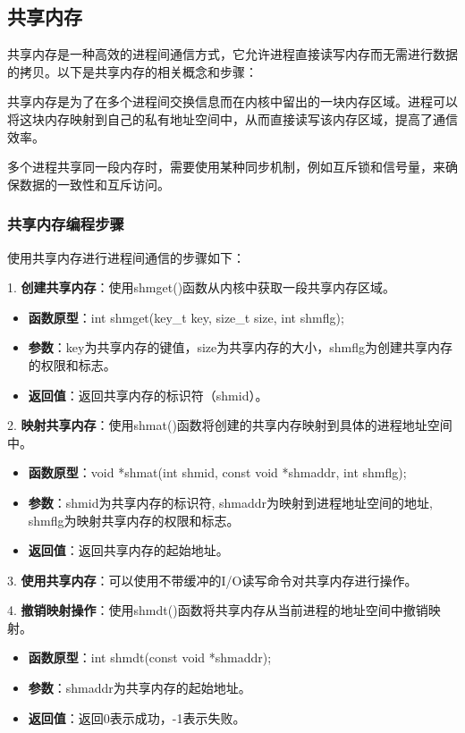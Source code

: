 \documentclass[12pt, a4paper, oneside]{ctexbook}
\numberwithin{figure}{section}
\begin{document}
\subsection{共享内存}
共享内存是一种高效的进程间通信方式，它允许进程直接读写内存而无需进行数据的拷贝。以下是共享内存的相关概念和步骤：

共享内存是为了在多个进程间交换信息而在内核中留出的一块内存区域。进程可以将这块内存映射到自己的私有地址空间中，从而直接读写该内存区域，提高了通信效率。

多个进程共享同一段内存时，需要使用某种同步机制，例如互斥锁和信号量，来确保数据的一致性和互斥访问。

\subsubsection{共享内存编程步骤}
使用共享内存进行进程间通信的步骤如下：

1. \textbf{创建共享内存}：使用shmget()函数从内核中获取一段共享内存区域。
   \begin{itemize}
       \item \textbf{函数原型}：int shmget(key_t key, size_t size, int shmflg);
       \item \textbf{参数}：key为共享内存的键值，size为共享内存的大小，shmflg为创建共享内存的权限和标志。
       \item \textbf{返回值}：返回共享内存的标识符（shmid）。
   \end{itemize}
   
2. \textbf{映射共享内存}：使用shmat()函数将创建的共享内存映射到具体的进程地址空间中。
   \begin{itemize}
       \item \textbf{函数原型}：void *shmat(int shmid, const void *shmaddr, int shmflg);
       \item \textbf{参数}：shmid为共享内存的标识符, shmaddr为映射到进程地址空间的地址, shmflg为映射共享内存的权限和标志。
       \item \textbf{返回值}：返回共享内存的起始地址。
   \end{itemize}

3. \textbf{使用共享内存}：可以使用不带缓冲的I/O读写命令对共享内存进行操作。

4. \textbf{撤销映射操作}：使用shmdt()函数将共享内存从当前进程的地址空间中撤销映射。
   \begin{itemize}
       \item \textbf{函数原型}：int shmdt(const void *shmaddr);
       \item \textbf{参数}：shmaddr为共享内存的起始地址。
       \item \textbf{返回值}：返回0表示成功，-1表示失败。
   \end{itemize}
\end{document}
